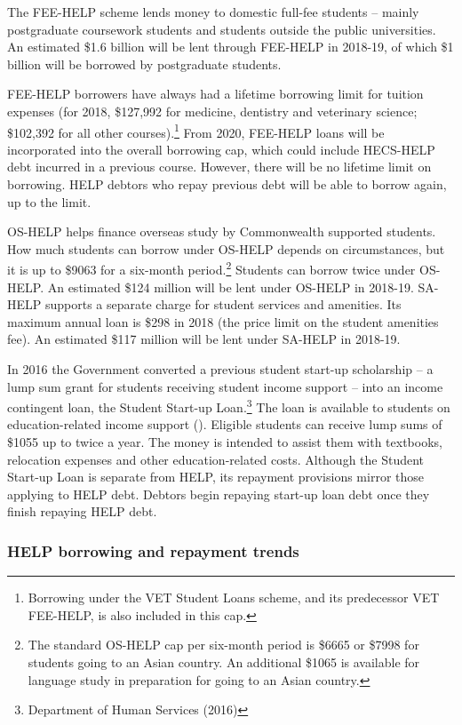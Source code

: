 \documentclass{grattan}
\begin{document}
The FEE-HELP scheme lends money to domestic full-fee students -- mainly postgraduate coursework students and students outside the public universities. An estimated \$1.6 billion will be lent through FEE-HELP in 2018-19, of which \$1 billion will be borrowed by postgraduate students.

FEE-HELP borrowers have always had a lifetime borrowing limit for tuition expenses (for 2018, \$127,992 for medicine, dentistry and veterinary science; \$102,392 for all other courses).\footnote{Borrowing under the VET Student Loans scheme, and its predecessor VET FEE-HELP, is also included in this cap.} From 2020, FEE-HELP loans will be incorporated into the overall borrowing cap, which could include HECS-HELP debt incurred in a previous course. However, there will be no lifetime limit on borrowing. HELP debtors who repay previous debt will be able to borrow again, up to the limit.

OS-HELP helps finance overseas study by Commonwealth supported students. How much students can borrow under OS-HELP depends on circumstances, but it is up to \$9063 for a six-month period.\footnote{The standard OS-HELP cap per six-month period is \$6665 or \$7998 for students going to an Asian country. An additional \$1065 is available for language study in preparation for going to an Asian country.} Students can borrow twice under OS-HELP. An estimated \$124 million will be lent under OS-HELP in 2018-19. SA-HELP supports a separate charge for student services and amenities. Its maximum annual loan is \$298 in 2018 (the price limit on the student amenities fee). An estimated \$117 million will be lent under SA-HELP in 2018-19.

In 2016 the Government converted a previous student start-up scholarship -- a lump sum grant for students receiving student income support -- into an income contingent loan, the Student Start-up Loan.\footnote{Department of Human Services (2016)} The loan is available to students on education-related income support (). Eligible students can receive lump sums of \$1055 up to twice a year. The money is intended to assist them with textbooks, relocation expenses and other education-related costs. Although the Student Start-up Loan is separate from HELP, its repayment provisions mirror those applying to HELP debt. Debtors begin repaying start-up loan debt once they finish repaying HELP debt.


\subsubsection{
HELP borrowing and repayment trends }\label{help-borrowing-and-repayment-trends}
\end{document}
